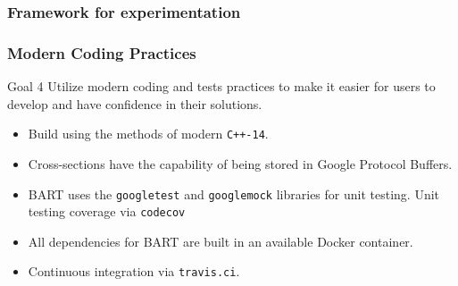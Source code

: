 \documentclass[xcolor=x11names, compress]{beamer}
\begin{document}
\begin{frame}
  \frametitle{Framework for experimentation}
\end{frame}

\begin{frame}
  \frametitle{Modern Coding Practices}
  \begin{block}{Goal 4}
    Utilize modern coding and tests practices to make it
    easier for users to develop and have confidence in their solutions.
  \end{block}
  \begin{itemize}
  \item Build using the methods of modern \texttt{C++-14}.
  \item Cross-sections have the capability of being stored in Google
    Protocol Buffers.
  \item BART uses the \texttt{googletest} and \texttt{googlemock}
    libraries for unit testing. Unit testing coverage via \texttt{codecov}
  \item All dependencies for BART are built in an available Docker
    container.
  \item Continuous integration via \texttt{travis.ci}.
  \end{itemize}  
    
\end{frame}
\end{document}
